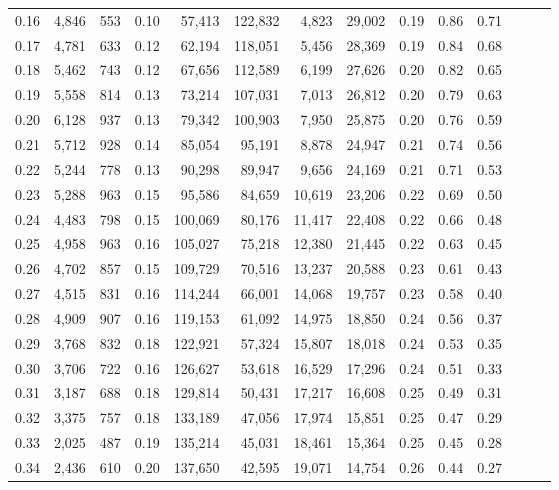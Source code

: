\begin{tabular}{rrrrrrrrrrrrrr}
0.16 &  4,846 &  553 &  0.10 &   57,413 &  122,832 &   4,823 &  29,002 &  0.19 &  0.86 &      0.71 \\
0.17 &  4,781 &  633 &  0.12 &   62,194 &  118,051 &   5,456 &  28,369 &  0.19 &  0.84 &      0.68 \\
0.18 &  5,462 &  743 &  0.12 &   67,656 &  112,589 &   6,199 &  27,626 &  0.20 &  0.82 &      0.65 \\
0.19 &  5,558 &  814 &  0.13 &   73,214 &  107,031 &   7,013 &  26,812 &  0.20 &  0.79 &      0.63 \\
0.20 &  6,128 &  937 &  0.13 &   79,342 &  100,903 &   7,950 &  25,875 &  0.20 &  0.76 &      0.59 \\
0.21 &  5,712 &  928 &  0.14 &   85,054 &   95,191 &   8,878 &  24,947 &  0.21 &  0.74 &      0.56 \\
0.22 &  5,244 &  778 &  0.13 &   90,298 &   89,947 &   9,656 &  24,169 &  0.21 &  0.71 &      0.53 \\
0.23 &  5,288 &  963 &  0.15 &   95,586 &   84,659 &  10,619 &  23,206 &  0.22 &  0.69 &      0.50 \\
0.24 &  4,483 &  798 &  0.15 &  100,069 &   80,176 &  11,417 &  22,408 &  0.22 &  0.66 &      0.48 \\
0.25 &  4,958 &  963 &  0.16 &  105,027 &   75,218 &  12,380 &  21,445 &  0.22 &  0.63 &      0.45 \\
0.26 &  4,702 &  857 &  0.15 &  109,729 &   70,516 &  13,237 &  20,588 &  0.23 &  0.61 &      0.43 \\
0.27 &  4,515 &  831 &  0.16 &  114,244 &   66,001 &  14,068 &  19,757 &  0.23 &  0.58 &      0.40 \\
0.28 &  4,909 &  907 &  0.16 &  119,153 &   61,092 &  14,975 &  18,850 &  0.24 &  0.56 &      0.37 \\
0.29 &  3,768 &  832 &  0.18 &  122,921 &   57,324 &  15,807 &  18,018 &  0.24 &  0.53 &      0.35 \\
0.30 &  3,706 &  722 &  0.16 &  126,627 &   53,618 &  16,529 &  17,296 &  0.24 &  0.51 &      0.33 \\
0.31 &  3,187 &  688 &  0.18 &  129,814 &   50,431 &  17,217 &  16,608 &  0.25 &  0.49 &      0.31 \\
0.32 &  3,375 &  757 &  0.18 &  133,189 &   47,056 &  17,974 &  15,851 &  0.25 &  0.47 &      0.29 \\
0.33 &  2,025 &  487 &  0.19 &  135,214 &   45,031 &  18,461 &  15,364 &  0.25 &  0.45 &      0.28 \\
0.34 &  2,436 &  610 &  0.20 &  137,650 &   42,595 &  19,071 &  14,754 &  0.26 &  0.44 &      0.27 \\

\end{tabular}
